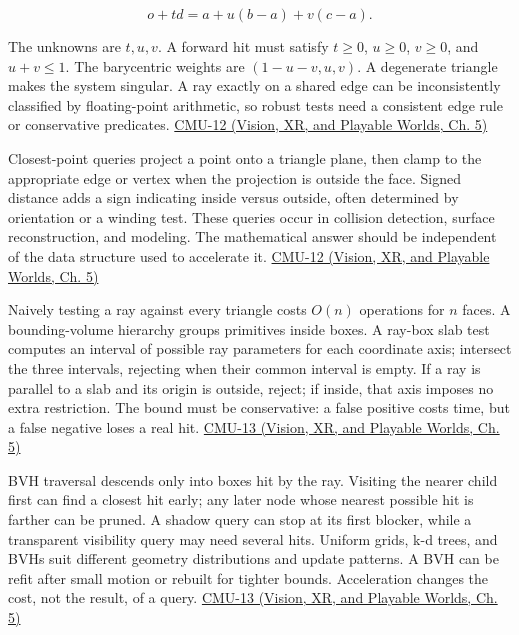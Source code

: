 \[
o+td=a+u(b-a)+v(c-a).
\]

The unknowns are \(t,u,v\). A forward hit must satisfy \(t\ge0\), \(u\ge0\), \(v\ge0\), and \(u+v\le1\). The barycentric weights are \((1-u-v,u,v)\). A degenerate triangle makes the system singular. A ray exactly on a shared edge can be inconsistently classified by floating-point arithmetic, so robust tests need a consistent edge rule or conservative predicates. \href{../07-Vision-XR-and-Playable-Worlds/main.pdf\#nameddest=04-visual-computing-ii-ch036-cmu-12---geometric-queries}{CMU-12 (Vision, XR, and Playable Worlds, Ch. 5)}

Closest-point queries project a point onto a triangle plane, then clamp to the appropriate edge or vertex when the projection is outside the face. Signed distance adds a sign indicating inside versus outside, often determined by orientation or a winding test. These queries occur in collision detection, surface reconstruction, and modeling. The mathematical answer should be independent of the data structure used to accelerate it. \href{../07-Vision-XR-and-Playable-Worlds/main.pdf\#nameddest=04-visual-computing-ii-ch036-cmu-12---geometric-queries}{CMU-12 (Vision, XR, and Playable Worlds, Ch. 5)}

Naively testing a ray against every triangle costs \(O(n)\) operations for \(n\) faces. A bounding-volume hierarchy groups primitives inside boxes. A ray-box slab test computes an interval of possible ray parameters for each coordinate axis; intersect the three intervals, rejecting when their common interval is empty. If a ray is parallel to a slab and its origin is outside, reject; if inside, that axis imposes no extra restriction. The bound must be conservative: a false positive costs time, but a false negative loses a real hit. \href{../07-Vision-XR-and-Playable-Worlds/main.pdf\#nameddest=04-visual-computing-ii-ch036-cmu-13---spatial-data-structures}{CMU-13 (Vision, XR, and Playable Worlds, Ch. 5)}

BVH traversal descends only into boxes hit by the ray. Visiting the nearer child first can find a closest hit early; any later node whose nearest possible hit is farther can be pruned. A shadow query can stop at its first blocker, while a transparent visibility query may need several hits. Uniform grids, k-d trees, and BVHs suit different geometry distributions and update patterns. A BVH can be refit after small motion or rebuilt for tighter bounds. Acceleration changes the cost, not the result, of a query. \href{../07-Vision-XR-and-Playable-Worlds/main.pdf\#nameddest=04-visual-computing-ii-ch036-cmu-13---spatial-data-structures}{CMU-13 (Vision, XR, and Playable Worlds, Ch. 5)}

